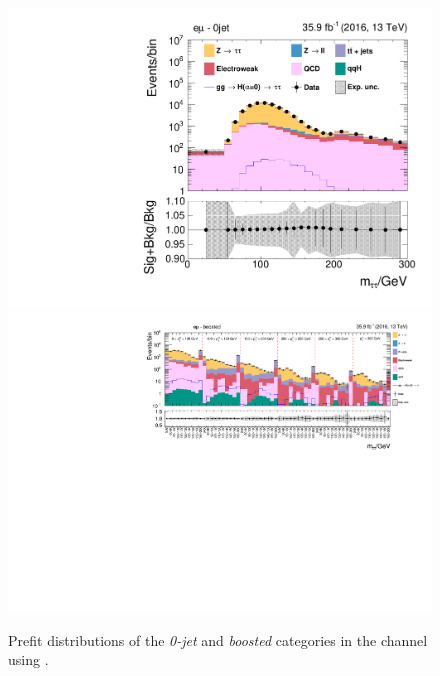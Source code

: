 \begin{figure}[h!]
    \centering
        \includegraphics[width=.5\textwidth]{Figures/statana/Postfit_JEC_jdphi/prefit_htt_em_1_13TeV.pdf}\\
        \includegraphics[width=\textwidth]{Figures/statana/Postfit_JEC_jdphi/prefit_htt_em_2_13TeV.pdf}
    \caption{Prefit distributions of the \textit{0-jet} and \textit{boosted} categories in the \emu{} channel using \jdphi{}.}
\end{figure} 
